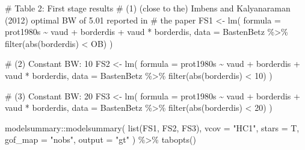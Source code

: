 \documentclass[
  letterpaper,
  DIV=11,
  oneside]{scrreprt}
\newenvironment{Shaded}{\begin{snugshade}}{\end{snugshade}}
\newcommand{\AttributeTok}[1]{\textcolor[rgb]{0.40,0.45,0.13}{#1}}
\newcommand{\CommentTok}[1]{\textcolor[rgb]{0.37,0.37,0.37}{#1}}
\newcommand{\DecValTok}[1]{\textcolor[rgb]{0.68,0.00,0.00}{#1}}
\newcommand{\FunctionTok}[1]{\textcolor[rgb]{0.28,0.35,0.67}{#1}}
\newcommand{\NormalTok}[1]{\textcolor[rgb]{0.00,0.23,0.31}{#1}}
\newcommand{\OtherTok}[1]{\textcolor[rgb]{0.00,0.23,0.31}{#1}}
\newcommand{\SpecialCharTok}[1]{\textcolor[rgb]{0.37,0.37,0.37}{#1}}
\newcommand{\StringTok}[1]{\textcolor[rgb]{0.13,0.47,0.30}{#1}}
\begin{document}
\begin{Shaded}
\end{Shaded}

\begin{Shaded}
\begin{Highlighting}[]
\CommentTok{\# Table 2: First stage results }
\CommentTok{\# (1) (close to the) Imbens and Kalyanaraman (2012) optimal BW of 5.01 reported in}
\CommentTok{\# the paper}
\NormalTok{FS1 }\OtherTok{\textless{}{-}} \FunctionTok{lm}\NormalTok{(}
  \AttributeTok{formula =}\NormalTok{ prot1980s }\SpecialCharTok{\textasciitilde{}}\NormalTok{ vaud }\SpecialCharTok{+}\NormalTok{ borderdis }\SpecialCharTok{+}\NormalTok{ vaud }\SpecialCharTok{*}\NormalTok{ borderdis, }
  \AttributeTok{data =}\NormalTok{ BastenBetz }\SpecialCharTok{\%\textgreater{}\%} \FunctionTok{filter}\NormalTok{(}\FunctionTok{abs}\NormalTok{(borderdis) }\SpecialCharTok{\textless{}}\NormalTok{ OB)}
\NormalTok{  )}

\CommentTok{\# (2) Constant BW: 10}
\NormalTok{FS2 }\OtherTok{\textless{}{-}} \FunctionTok{lm}\NormalTok{(}
  \AttributeTok{formula =}\NormalTok{ prot1980s }\SpecialCharTok{\textasciitilde{}}\NormalTok{ vaud }\SpecialCharTok{+}\NormalTok{ borderdis }\SpecialCharTok{+}\NormalTok{ vaud }\SpecialCharTok{*}\NormalTok{ borderdis, }
  \AttributeTok{data =}\NormalTok{ BastenBetz }\SpecialCharTok{\%\textgreater{}\%} \FunctionTok{filter}\NormalTok{(}\FunctionTok{abs}\NormalTok{(borderdis) }\SpecialCharTok{\textless{}} \DecValTok{10}\NormalTok{)}
\NormalTok{  )}

\CommentTok{\# (3)  Constant BW: 20}
\NormalTok{FS3 }\OtherTok{\textless{}{-}} \FunctionTok{lm}\NormalTok{(}
  \AttributeTok{formula =}\NormalTok{ prot1980s }\SpecialCharTok{\textasciitilde{}}\NormalTok{ vaud }\SpecialCharTok{+}\NormalTok{ borderdis }\SpecialCharTok{+}\NormalTok{ vaud }\SpecialCharTok{*}\NormalTok{ borderdis, }
  \AttributeTok{data =}\NormalTok{ BastenBetz }\SpecialCharTok{\%\textgreater{}\%} \FunctionTok{filter}\NormalTok{(}\FunctionTok{abs}\NormalTok{(borderdis) }\SpecialCharTok{\textless{}} \DecValTok{20}\NormalTok{)}
\NormalTok{  )}
\end{Highlighting}
\end{Shaded}

\begin{Shaded}
\begin{Highlighting}[]
\NormalTok{modelsummary}\SpecialCharTok{::}\FunctionTok{modelsummary}\NormalTok{(}
  \FunctionTok{list}\NormalTok{(FS1, FS2, FS3), }
  \AttributeTok{vcov =} \StringTok{"HC1"}\NormalTok{, }\AttributeTok{stars =}\NormalTok{ T, }\AttributeTok{gof\_map =} \StringTok{"nobs"}\NormalTok{, }\AttributeTok{output =} \StringTok{"gt"}
\NormalTok{) }\SpecialCharTok{\%\textgreater{}\%}
  \FunctionTok{tabopts}\NormalTok{()}
\end{Highlighting}
\end{Shaded}
\end{document}
